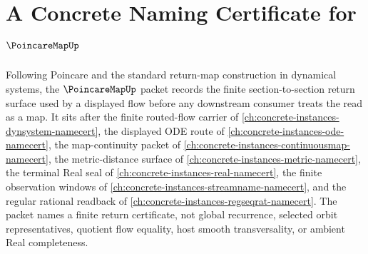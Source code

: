 \chapter{A Concrete Naming Certificate for $\PoincareMapUp$}
\label{ch:concrete-instances-poincare-map-namecert}

Following Poincare and the standard return-map construction in dynamical systems, the $\PoincareMapUp$ packet records the finite section-to-section return surface used by a displayed flow before any downstream consumer treats the read as a map. It sits after the finite routed-flow carrier of \autoref{ch:concrete-instances-dynsystem-namecert}, the displayed ODE route of \autoref{ch:concrete-instances-ode-namecert}, the map-continuity packet of \autoref{ch:concrete-instances-continuousmap-namecert}, the metric-distance surface of \autoref{ch:concrete-instances-metric-namecert}, the terminal Real seal of \autoref{ch:concrete-instances-real-namecert}, the finite observation windows of \autoref{ch:concrete-instances-streamname-namecert}, and the regular rational readback of \autoref{ch:concrete-instances-regseqrat-namecert}. The packet names a finite return certificate, not global recurrence, selected orbit representatives, quotient flow equality, host smooth transversality, or ambient Real completeness.

